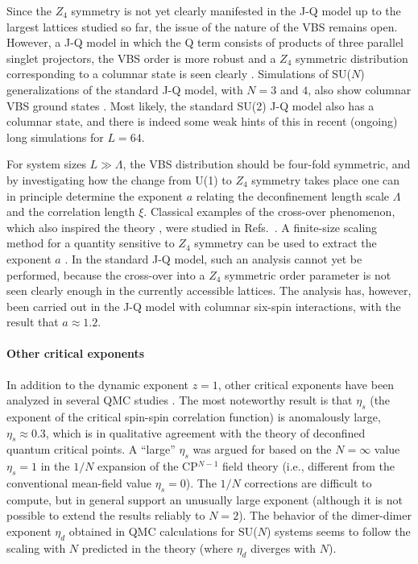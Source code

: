 \documentclass[draft,numberedheadings]{aipproc}
\begin{document}
Since the $Z_4$ symmetry is not yet clearly manifested in the J-Q model up to the largest lattices studied so far, the issue of the nature of the VBS remains 
open. However, a J-Q model in which the Q term consists of products of three parallel singlet projectors, the VBS order is more robust and a $Z_4$ symmetric 
distribution corresponding to a columnar state is seen clearly \cite{lou1}. Simulations of SU($N$) generalizations of the standard J-Q model, with $N=3$ and 
$4$, also show columnar VBS ground states \cite{lou1}. Most likely, the standard SU(2) J-Q model also has a columnar state, and there is indeed some weak
hints of this in recent (ongoing) long simulations for $L=64$. 

For system sizes $L\gg\Lambda$, the VBS distribution should be four-fold symmetric, and by investigating how the change from U(1) to $Z_4$ symmetry takes place 
one can in principle determine the exponent $a$ relating the deconfinement length scale $\Lambda$ and the correlation length $\xi$. Classical examples of 
the cross-over phenomenon, which also inspired the theory \cite{senthil1}, were studied in Refs.~\cite{oshikawa00,carmona00,hove03,lou07b}. A finite-size 
scaling method for a quantity sensitive to $Z_4$ symmetry can be used to extract the exponent $a$ \cite{lou07b}. In the standard J-Q model, such an analysis 
cannot yet be performed, because the cross-over into a $Z_4$ symmetric order parameter is not seen clearly enough in the currently accessible lattices. 
The analysis has, however, been carried out in the J-Q model with columnar six-spin interactions, with the result that $a\approx 1.2$.

\paragraph{Other critical  exponents}

In addition to the dynamic exponent $z=1$, other critical exponents have been analyzed in several QMC studies \cite{sandvik1,melko08a,melko08b,lou1,sandviklogs}. 
The most noteworthy result is that $\eta_s$ (the exponent of the critical spin-spin correlation function) is anomalously large, $\eta_s \approx 0.3$, which 
is in qualitative agreement with the theory of deconfined quantum critical points. A ``large'' $\eta_s$ was argued for \cite{senthil1} based on the $N=\infty$ 
value $\eta_s=1$ in the $1/N$ expansion of the CP$^{N-1}$ field theory (i.e., different from the conventional mean-field value $\eta_s=0$). The $1/N$ corrections 
are difficult to compute, but  in general support an unusually large exponent \cite{nogueira07} (although it is not possible to extend the results reliably to 
$N=2$). The behavior of the dimer-dimer exponent $\eta_d$ obtained in QMC calculations for SU($N$) systems \cite{lou1} seems to follow the scaling with $N$ 
predicted in the theory \cite{metlitski08,murthy90} (where $\eta_d$ diverges with $N$). 
\end{document}
